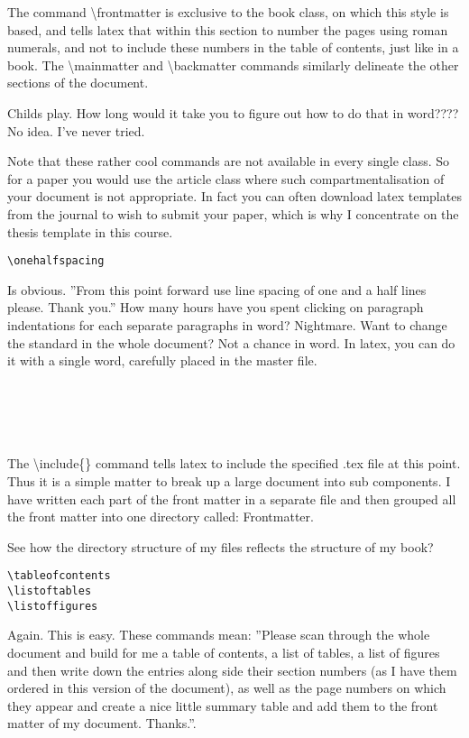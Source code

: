The command {\textbackslash}frontmatter is exclusive to the book class, on which this style is based, and tells latex that within this section to number the pages using roman numerals, and not to include these numbers in the table of contents, just like in a book. The {\textbackslash}mainmatter and {\textbackslash}backmatter commands similarly delineate the other sections of the document.  

Childs play.  How long would it take you to figure out how to do that in word???? No idea. I've never tried.

Note that these rather cool commands are not available in every single class. So for a paper you would use the article class where such compartmentalisation of your document is not appropriate. In fact you can often download latex templates from the journal to wish to submit your paper, which is why I concentrate on the thesis template in this course.

\begin{verbatim}
\onehalfspacing
\end{verbatim}

Is obvious. ''From this point forward use line spacing of one and a half lines please. Thank you.'' How many hours have you spent clicking on paragraph indentations for each separate paragraphs in word? Nightmare. Want to change the standard in the whole document? Not a chance in word. In latex, you can do it with a single word, carefully placed in the master file.

\begin{verbatim}





\end{verbatim}

The {\textbackslash}include\{\} command tells latex to include the specified .tex file at this point.  Thus it is a simple matter to break up a large document into sub components.  I have written each part of the front matter in a separate file and then grouped all the front matter into one directory called: Frontmatter.

See how the directory structure of my files reflects the structure of my book?

\begin{verbatim}
\tableofcontents
\listoftables
\listoffigures
\end{verbatim}

Again. This is easy. These commands mean: ''Please scan through the whole document and build for me a table of contents, a list of tables, a list of figures and then write down the entries along side their section numbers (as I have them ordered in this version of the document), as well as the page numbers on which they appear and create a nice little summary table and add them to the front matter of my document. Thanks.''.

